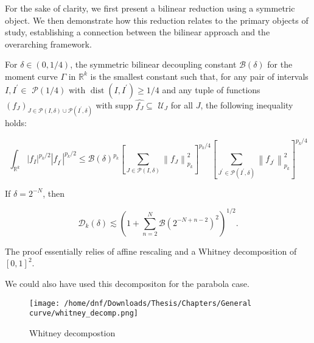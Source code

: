 For the sake of clarity, we first present a bilinear reduction using a symmetric object. We then demonstrate how this reduction relates to the primary objects of study, establishing a connection between the bilinear approach and the overarching framework.

\begin{defn}
    For $\delta \in(0,1 / 4)$, the symmetric bilinear decoupling constant $\mathcal{B}(\delta)$ for the moment curve $\Gamma$ in $\mathbb{R}^{k}$ is the smallest constant such that, for any pair of intervals $I, I^{\prime} \in$ $\mathcal{P}(1 / 4)$ with $\operatorname{dist}\left(I, I^{\prime}\right) \geqslant 1 / 4$ and any tuple of functions $\left(f_{J}\right)_{J \in \mathcal{P}(I, \delta) \cup \mathcal{P}\left(I^{\prime}, \delta\right)}$ with supp $\widehat{f_{J}} \subseteq$ $\mathcal{U}_{J}$ for all $J$, the following inequality holds:

\begin{equation*}
\int_{\mathbb{R}^{k}}\left|f_{I}\right|^{p_{k} / 2}\left|f_{I^{\prime}}\right|^{p_{k} / 2} \leqslant \mathcal{B}(\delta)^{p_{k}}\left[\sum_{J \in \mathcal{P}(I, \delta)}\left\|f_{J}\right\|_{p_{k}}^{2}\right]^{p_{k} / 4}\left[\sum_{J^{\prime} \in \mathcal{P}\left(I^{\prime}, \delta\right)}\left\|f_{J^{\prime}}\right\|_{p_{k}}^{2}\right]^{p_{k} / 4} 
\end{equation*}

\end{defn}

\begin{lem}\label{lem:bil_redu}
If $\delta=2^{-N}$, then

\begin{equation*}
\mathcal{D}_{k}(\delta) \lesssim\left(1+\sum_{n=2}^{N} \mathcal{B}\left(2^{-N+n-2}\right)^{2}\right)^{1 / 2}.
\end{equation*}
\end{lem}

The proof essentially relies of affine rescaling and a Whitney decomposition of $[0,1]^2$. 

\begin{rmk}
    We could also have used this decompositon for the parabola case.
\end{rmk}
\begin{figure}[h!]
    \centering
    \texttt{[image: /home/dnf/Downloads/Thesis/Chapters/General curve/whitney\_decomp.png]}
    \caption{Whitney decompostion}
    \label{fig:whitney}
\end{figure}



